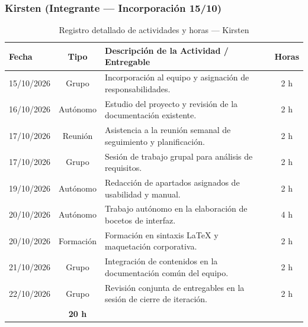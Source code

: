 \subsubsection{Kirsten (Integrante  — Incorporación 15/10)}
\begin{table}[H]
\centering
\small
{}
\begin{tabularx}{\textwidth}{l c X c}
\toprule
\rowcolor{verdeApagado}
\textbf{\color{textoOscuro}Fecha} & \textbf{\color{textoOscuro}Tipo} & \textbf{\color{textoOscuro}Descripción de la Actividad / Entregable} & \textbf{\color{textoOscuro}Horas} \\
\midrule
15/10/2026 & Grupo & Incorporación al equipo y asignación de responsabilidades. & 2 h \\
16/10/2026 & Autónomo & Estudio del proyecto y revisión de la documentación existente. & 2 h \\
17/10/2026 & Reunión & Asistencia a la reunión semanal de seguimiento y planificación. & 2 h \\
17/10/2026 & Grupo & Sesión de trabajo grupal para análisis de requisitos. & 2 h \\
19/10/2026 & Autónomo & Redacción de apartados asignados de usabilidad y manual. & 2 h \\
20/10/2026 & Autónomo & Trabajo autónomo en la elaboración de bocetos de interfaz. & 4 h \\
20/10/2026 & Formación & Formación en sintaxis \LaTeX{} y maquetación corporativa. & 2 h \\
21/10/2026 & Grupo & Integración de contenidos en la documentación común del equipo. & 2 h \\
22/10/2026 & Grupo & Revisión conjunta de entregables en la sesión de cierre de iteración. & 2 h \\
\midrule
\rowcolor{azulclaro!60}
\multicolumn{3}{l}{\textbf{\color{textoOscuro}Total Horas Dedicadas — Kirsten:}} & \textbf{\color{textoOscuro}20 h} \\
\bottomrule
\end{tabularx}
\caption{Registro detallado de actividades y horas — Kirsten}
\end{table}